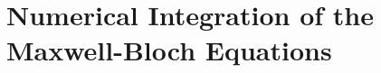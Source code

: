 \chapter[Numerical Integration of the Maxwell-Bloch Equations]
  {Numerical Integration of the\\ Maxwell-Bloch Equations}
  \label{apx:mb_eqns}